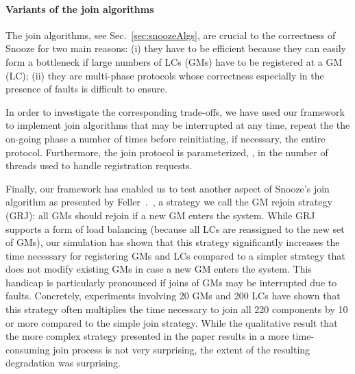 \paragraph{Variants of the join algorithms}

The join algorithms, see Sec.~\ref{sec:snoozeAlgs}, are crucial to the
correctness of Snooze for two main reasons: (i) they have to be
efficient because they can easily form a bottleneck if large numbers
of LCs (GMs) have to be registered at a GM (LC); (ii) they are
multi-phase protocols whose correctness especially in the presence of
faults is difficult to ensure.

In order to investigate the corresponding trade-offs, we have used our
framework to implement join algorithms that may be interrupted at any
time, repeat the the on-going phase a number of times before
reinitiating, if necessary, the entire protocol. Furthermore, the join
protocol is parameterized, \eg, in the number of threads used to
handle registration requests.

Finally, our framework has enabled us to test another aspect of
Snooze's join algorithm as presented by
Feller~\etal.~\cite{feller:ccgrid12},
a strategy we call the GM rejoin
strategy (GRJ): all GMs should rejoin if a new GM enters the
system. While GRJ supports a form of load balancing (because all LCs
are reassigned to the new set of GMs), our simulation has shown that
this strategy significantly increases the time necessary for
registering GMs and LCs compared to a simpler strategy that does not
modify existing GMs in case a new GM enters the system. This handicap
is particularly pronounced if joins of GMs may be interrupted due to
faults. Concretely, experiments involving 20 GMs and 200 LCs have
shown that this strategy often multiplies the time necessary to join
all 220 components by 10 or more compared to the simple join
strategy. While the qualitative result that the more complex strategy
presented in the paper results in a more time-consuming join process
is not very surprising, the extent of the resulting degradation was
surprising.



